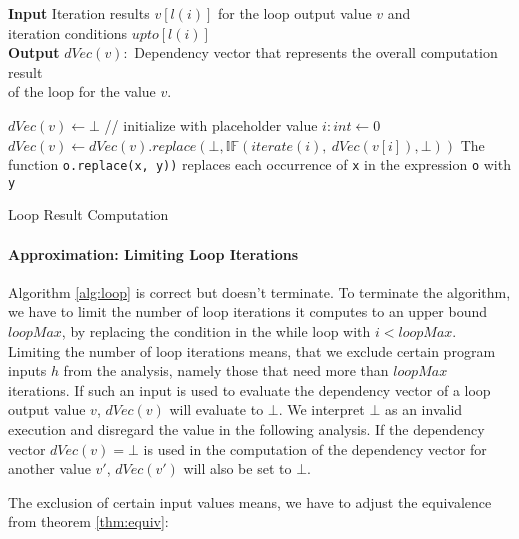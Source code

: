 \begin{algorithm}
    \hspace*{\algorithmicindent} \textbf{Input} Iteration results $v[l(i)]$ for the loop output value $v$ and \\
    \hspace*{\algorithmicindent} iteration conditions $upto[l(i)]$ \\
    \hspace*{\algorithmicindent} \textbf{Output} $dVec(v):$ Dependency vector that represents the overall computation result\\
    \hspace*{\algorithmicindent} \hspace*{\algorithmicindent}of the loop for the value $v$. \\
    \begin{algorithmic}[1]
        \State $dVec(v) \leftarrow \bot$ // initialize with placeholder value
        \State $i: int \leftarrow 0$
        \While{$\mttt$}
            \State $dVec(v) \leftarrow dVec(v).replace(\bot, \mathbb{IF}(iterate(i), \: dVec(v[i]), \bot))$
        \EndWhile
        \State The function \texttt{o.replace(x, y))} replaces each occurrence of \texttt{x} in the expression \texttt{o} with \texttt{y}
        \end{algorithmic} 
\caption{Loop Result Computation}\label{alg:loop}
\end{algorithm}


\paragraph{Approximation: Limiting Loop Iterations}
Algorithm \ref{alg:loop} is correct but doesn't terminate. To terminate the algorithm, we have to limit the number of loop iterations it computes to an upper bound $loopMax$, by replacing the condition in the while loop with $i < loopMax$.
Limiting the number of loop iterations means, that we exclude certain program inputs $h$ from the analysis, namely those that need more than $loopMax$ iterations. If such an input is used to evaluate the dependency vector of a loop output value $v$, $dVec(v)$ will evaluate to $\bot$. We interpret $\bot$ as an invalid execution and disregard the value in the following analysis. If the dependency vector $dVec(v) = \bot$ is used in the computation of the dependency vector for another value $v'$, $dVec(v')$ will also be set to $\bot$.

The exclusion of certain input values means, we have to adjust the equivalence from theorem \ref{thm:equiv}:

